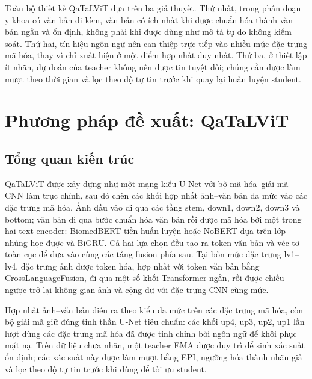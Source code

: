 Toàn bộ thiết kế QaTaLViT dựa trên ba giả thuyết. Thứ nhất, trong phân đoạn y khoa có văn bản đi kèm, văn bản có ích nhất khi được chuẩn hóa thành văn bản ngắn và ổn định, không phải khi được dùng như mô tả tự do không kiểm soát. Thứ hai, tín hiệu ngôn ngữ nên can thiệp trực tiếp vào nhiều mức đặc trưng mã hóa, thay vì chỉ xuất hiện ở một điểm hợp nhất duy nhất. Thứ ba, ở thiết lập ít nhãn, dự đoán của teacher không nên được tin tuyệt đối; chúng cần được làm mượt theo thời gian và lọc theo độ tự tin trước khi quay lại huấn luyện student.

\section{Phương pháp đề xuất: QaTaLViT}
\label{sec:method}

\subsection{Tổng quan kiến trúc}

QaTaLViT được xây dựng như một mạng kiểu U-Net với bộ mã hóa--giải mã CNN làm trục chính, sau đó chèn các khối hợp nhất ảnh--văn bản đa mức vào các đặc trưng mã hóa. Ảnh đầu vào đi qua các tầng stem, down1, down2, down3 và bottom; văn bản đi qua bước chuẩn hóa văn bản rồi được mã hóa bởi một trong hai text encoder: BiomedBERT tiền huấn luyện hoặc NoBERT dựa trên lớp nhúng học được và BiGRU. Cả hai lựa chọn đều tạo ra token văn bản và véc-tơ toàn cục để đưa vào cùng các tầng fusion phía sau. Tại bốn mức đặc trưng lv1--lv4, đặc trưng ảnh được token hóa, hợp nhất với token văn bản bằng CrossLanguageFusion, đi qua một số khối Transformer ngắn, rồi được chiếu ngược trở lại không gian ảnh và cộng dư với đặc trưng CNN cùng mức.

Hợp nhất ảnh--văn bản diễn ra theo kiểu đa mức trên các đặc trưng mã hóa, còn bộ giải mã giữ đúng tinh thần U-Net tiêu chuẩn: các khối up4, up3, up2, up1 lần lượt dùng các đặc trưng mã hóa đã được tinh chỉnh bởi ngôn ngữ để khôi phục mặt nạ. Trên dữ liệu chưa nhãn, một teacher EMA được duy trì để sinh xác suất ổn định; các xác suất này được làm mượt bằng EPI, ngưỡng hóa thành nhãn giả và lọc theo độ tự tin trước khi dùng để tối ưu student.

